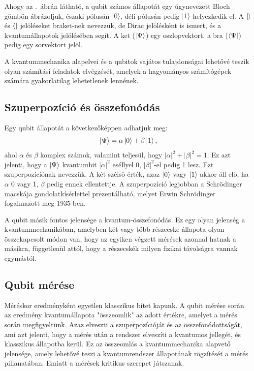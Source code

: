 \documentclass[
]{thesis-ekf}
\theoremstyle{definition}
\theoremstyle{remark}
\begin{document}
Ahogy az \az{\ref{fig:bitqubit}}.~ábrán látható, a qubit számos állapotát egy úgynevezett Bloch gömbön ábrázoljuk, északi pólusán $\ket{0}$, déli pólusán pedig $\ket{1}$ helyezkedik el. A $\ket{}$ és $\bra{}$ jelöléseket braket-nek nevezzük, de Dirac jelölésként is ismert, és a kvantumállapotok jelölésében segít. A ket ($\ket{\Psi}$) egy oszlopvektort, a bra ($\bra{\Psi}$) pedig egy sorvektort jelöl.

A kvantummechanika alapelvei és a qubitok sajátos tulajdonságai lehetővé teszik
olyan számítási feladatok elvégzését, amelyek a hagyományos számítógépek számára gyakorlatilag lehetetlenek lennének.

\subsection{Szuperpozíció és összefonódás}

Egy qubit állapotát a következőképpen adhatjuk meg:
\begin{equation}
	\ket{\Psi}=\alpha\ket{0}+\beta\ket{1},
\end{equation}
ahol $\alpha$ és $\beta$ komplex számok, valamint teljesül, hogy $|\alpha|^2+|\beta|^2=1$. Ez azt jelenti, hogy a $\ket{\Psi}$ kvantumbit $|\alpha|^2$ eséllyel 0, $|\beta|^2$-el pedig 1 lesz. Ezt szuperpozíciónak nevezzük. A két szélső érték, azaz $\ket{0}$ vagy $\ket{1}$ akkor áll elő, ha $\alpha$ 0 vagy 1, $\beta$ pedig ennek ellentettje. A szuperpozíció legjobban a Schrödinger macskája gondolatkísérlettel prezentálható, melyet Erwin Schrödinger fogalmazott meg 1935-ben.

A qubit másik fontos jelensége a kvantum-összefonódás. Ez egy olyan jelenség a kvantummechanikában, amelyben két vagy több részecske állapota olyan összekapcsolt módon van, hogy az egyiken végzett mérések azonnal hatnak a másikra, függetlenül attól, hogy a részecskék milyen fizikai távolságra vannak egymástól.

\subsection{Qubit mérése}
Méréskor eredményként egyetlen klasszikus bitet kapunk. A qubit mérése során az eredmény kvantumállapota "összeomlik" az adott értékre, amelyet a mérés során megfigyeltünk. Azaz elveszti a szuperpozícióját és az összefonódottságát, ami azt jelenti, hogy a mérés után a rendszer elveszíti a kvantumos jellegét, és klasszikus állapotba kerül. Ez az összeomlás a kvantummechanika alapvető jelensége, amely lehetővé teszi a kvantumrendszer állapotának rögzítését a mérés pillanatában. Emiatt a mérések kritikus szerepet játszanak.
\end{document}

